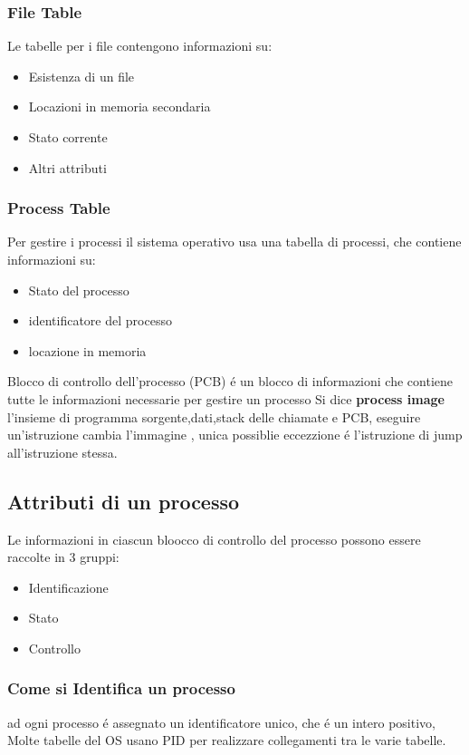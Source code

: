 \documentclass[11pt]{article}
\begin{document}
\subsubsection{File Table}
Le tabelle per i file contengono informazioni su:
\begin{itemize}
    \item Esistenza di un file
    \item Locazioni in memoria secondaria
    \item Stato corrente
    \item Altri attributi
\end{itemize}
\subsubsection{Process Table}
Per gestire i processi il sistema operativo usa una tabella di processi, che contiene informazioni su:
\begin{itemize}
    \item Stato del processo
    \item identificatore del processo
    \item locazione in memoria
\end{itemize}
Blocco di controllo dell'processo (PCB) é un blocco di informazioni che contiene tutte le informazioni necessarie per gestire un processo
\newline
Si dice \textbf{process image} l'insieme di programma sorgente,dati,stack delle chiamate e PCB, eseguire un'istruzione cambia l'immagine
, unica possiblie eccezzione é l'istruzione di jump all'istruzione stessa.
\subsection{Attributi di un processo}
Le informazioni in ciascun bloocco di controllo del processo possono essere raccolte in 3 gruppi:
\begin{itemize}
    \item Identificazione
    \item Stato
    \item Controllo
\end{itemize}
\subsubsection{Come si Identifica un processo}
ad ogni processo é assegnato un identificatore unico, che é un intero positivo, Molte tabelle del OS usano PID
per realizzare collegamenti tra le varie tabelle.
\end{document}
